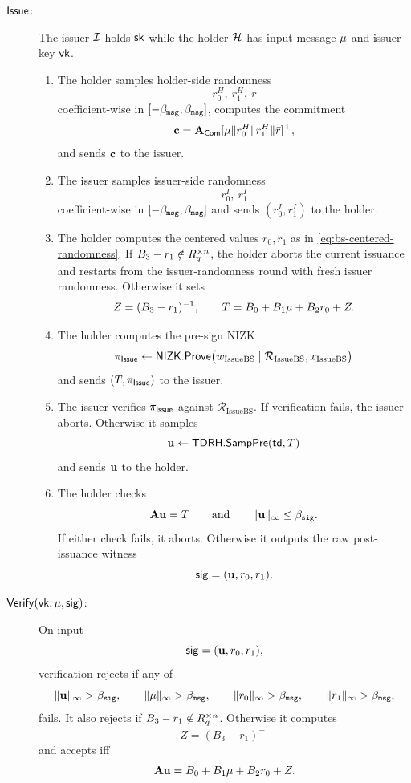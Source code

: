 \begin{description}
\item[$\mathsf{Issue}$:] The issuer $\mathcal{I}$ holds $\mathsf{sk}$ while the holder $\mathcal{H}$ has input message $\mathbf{\mu}$ and
issuer key $\mathsf{vk}$.
\begin{enumerate}[leftmargin=1.25em]
  \item The holder samples holder-side randomness
  \[
    r_0^H,\ r_1^H,\ \bar r
  \]
  coefficient-wise in $[-\beta_{\mathtt{msg}},\beta_{\mathtt{msg}}]$, computes the commitment
  \[
    \mathbf{c}=\mathbf{A}_{\mathsf{Com}}[\mathbf{\mu}\Vert r_0^H\Vert r_1^H\Vert \bar r]^\top,
  \]
  and sends $\mathbf{c}$ to the issuer.
  \item The issuer samples issuer-side randomness
  \[
    r_0^I,\ r_1^I
  \]
  coefficient-wise in $[-\beta_{\mathtt{msg}},\beta_{\mathtt{msg}}]$ and sends $(r_0^I,r_1^I)$ to the holder.
  \item The holder computes the centered values $r_0,r_1$ as in
  \eqref{eq:bs-centered-randomness}.  If $B_3-r_1\notin R_q^{\times n}$, the holder aborts the current issuance and restarts from the issuer-randomness round with fresh issuer randomness.  Otherwise it sets
  \[
    Z=(B_3-r_1)^{-1},
    \qquad
    T=B_0+B_1\mathbf{\mu}+B_2r_0+Z.
  \]
  \item The holder computes the pre-sign NIZK
  \[
    \pi_{\mathsf{Issue}}\gets \mathsf{NIZK}.\mathsf{Prove}
      \bigl(w_{\mathrm{IssueBS}}\mid \mathcal R_{\mathrm{IssueBS}},x_{\mathrm{IssueBS}}\bigr)
  \]
  and sends $(T,\pi_{\mathsf{Issue}})$ to the issuer.
  \item The issuer verifies $\pi_{\mathsf{Issue}}$ against $\mathcal R_{\mathrm{IssueBS}}$.  If verification fails, the issuer
  aborts.  Otherwise it samples
  \[
    \mathbf{u}\gets \mathsf{TDRH}.\mathsf{SampPre}(\mathsf{td},T)
  \]
  and sends $\mathbf{u}$ to the holder.
  \item The holder checks
  \[
    \mathbf{A}\mathbf{u}=T
    \qquad\text{and}\qquad
    \|\mathbf{u}\|_\infty\le \beta_{\mathtt{sig}}.
  \]
  If either check fails, it aborts.  Otherwise it outputs the raw post-issuance witness
  \[
    \mathsf{sig}=(\mathbf{u},r_0,r_1).
  \]
\end{enumerate}

\item[$\mathsf{Verify}(\mathsf{vk},\mathbf{\mu},\mathsf{sig})$:] On input
\[
  \mathsf{sig}=(\mathbf{u},r_0,r_1),
\]
verification rejects if any of
\[
  \|\mathbf{u}\|_\infty>\beta_{\mathtt{sig}},
  \qquad
  \|\mathbf{\mu}\|_\infty>\beta_{\mathtt{msg}},
  \qquad
  \|r_0\|_\infty>\beta_{\mathtt{msg}},
  \qquad
  \|r_1\|_\infty>\beta_{\mathtt{msg}},
\]
fails.  It also rejects if $B_3-r_1\notin R_q^{\times n}$.  Otherwise it computes
\[
  Z=(B_3-r_1)^{-1}
\]
and accepts iff
\[
  \mathbf{A}\mathbf{u}=B_0+B_1\mathbf{\mu}+B_2r_0+Z.
\]
\end{description}


